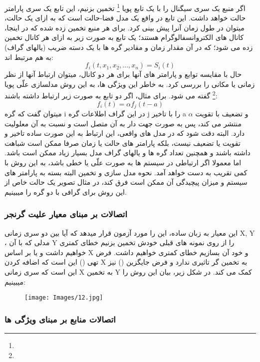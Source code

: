 \documentclass[11pt]{extarticle}
\begin{document}
اگر منبع یک سری سیگنال را با یک تابع پویا
\footnote{}
تخمین بزنیم، این تابع یک سری پارامتر حالت خواهد داشت. این تابع در واقع یک مدل فضا-حالت است که به ازای یک حالت، میتوان در طول زمان آنرا پیش بینی کرد. برای هر منبع تخمین زده شده که در اینجا، کانال های الکتروانسفالوگرام هستند؛ یک تابع به صورت زیر به ازای هر کانال تخمین زده می شود؛ که در آن مقدار زمان و مقادیر گره ها با یک دسته ضریب (یالهای گراف) به هم مرتبط اند:
$$ f_i(t, x_1, x_2, ..., x_n) = S_i(t)$$
حال با مقایسه توابع و پارامتر های آنها برای هر دو کانال، میتوان ارتباط آنها از نظر زمانی یا مکانی را بررسی کرد. به خاطر این ویژگی ها، به این روش مدلسازی علّی پویا
\footnote{}
 گفته می شود. برای مثال، اگر دو تابع به صورت زیر ارتباط داشته باشند:
$$ f_i(t) = \alpha f_j(t-a)$$
میتوان گفت که گره i در این گراف اطلاعات گره j را با تاخیر a و تضعیف با تقویت 
$\alpha$
منتشر می کند، پس به صورت جهت دار به آن متصل است و نسبت به آن معلولیت دارد. البته دقت شود که در مدل های واقعی، این ارتباط به این صورت ساده تاخیر و تقویت یا تضعیف نیست، بلکه پارامتر های حالت یا زمان صرفا ممکن است شباهت داشته باشند و همچنین تعداد گره ها و یالهای گراف مدل بسیار زیاد ممکن است باشد. اما معمولا اگر ارتباطی در سیستم ها به صورت علّی یا خطی باشد، به این روش با کمی تقریب به دست خواهد آمد. نحوه مدل سازی و تخمین البته بسته به پارامتر های سیستم و میزان پیچیدگی آن ممکن است فرق کند، در مثال تصویر یک حالت خاص از این روش برای گرافی با دو گره را میبینیم.

\subsubsection{اتصالات بر مبنای معیار علیت گرنجر}

این معیار به زبان ساده، این را مورد آزمون قرار میدهد که آیا بین دو سری زمانی X, Y ، مدلی که با آن Y را از روی نمونه های قبلی خودش تخمین بزنیم خطای کمتری خواهیم داشت و یا بر اساس X و خود آن بسازیم خطای کمتری خواهیم داشت. فرض تهی () این است که اضافه کردن X به تخمین گر تاثیری ندارد و فرض جایگزین () نیز این است که سری زمانی X به تخمین Y کمک می کند. در شکل زیر، بیان این روش را میبینیم: 

\begin{figure}[h!]
	\centering
	\texttt{[image: Images/12.jpg]}
	\caption{}
	\label{fig:11}
\end{figure}

\subsubsection{اتصالات منابع بر مبنای ویژگی ها}
\end{document}
